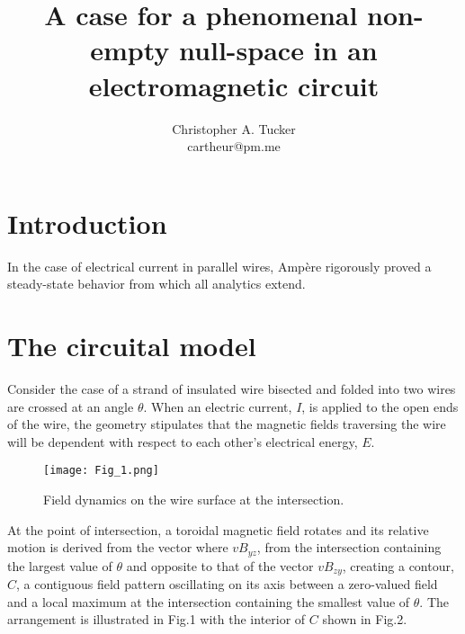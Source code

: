 \documentclass[]{article}
\begin{document}
\title{A case for a phenomenal non-empty null-space in an electromagnetic circuit}

\author{Christopher A. Tucker\\cartheur@pm.me\\}


\maketitle


\section{Introduction}
In the case of electrical current in parallel wires, Amp\`ere rigorously proved a steady-state behavior from which all analytics extend. 

\section{The circuital model}
Consider the case of a strand of insulated wire bisected and folded into two wires are crossed at an angle $\theta$. When an electric current, $I$, is applied to the open ends of the wire, the geometry stipulates that the magnetic fields traversing the wire will be dependent with respect to each other's electrical energy, $E$.

\begin{figure}
  \texttt{[image: Fig\_1.png]}
\caption{Field dynamics on the wire surface at the intersection.}\label{fig:fig1}
\end{figure}

At the point of intersection, a toroidal magnetic field rotates and its relative motion is derived from the vector where $v{{B}_{yz}}$, from the intersection containing the largest value of $\theta$ and opposite to that of the vector $v{{B}_{zy}}$, creating a contour, $C$, a contiguous field pattern oscillating on its axis between a zero-valued field and a local maximum at the intersection containing the smallest value of $\theta$. The arrangement is illustrated in Fig.1 with the interior of $C$ shown in Fig.2.
\end{document}
